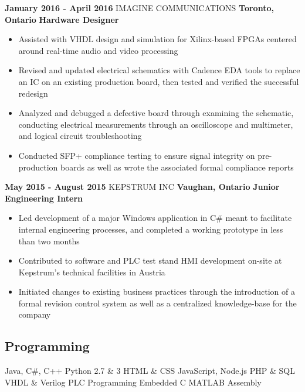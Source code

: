 \documentclass[hidelinks]{kkurucz-cv}
\begin{document}
\begin{minipage}{\textwidth}
\begin{entrylist}
\entry
{\textbf{January 2016 - April 2016}}
{IMAGINE COMMUNICATIONS}
{\textbf{Toronto, Ontario}}
{\textbf{Hardware Designer}}
{
\begin{itemize}
	\item Assisted with VHDL design and simulation for Xilinx-based FPGAs centered around real-time audio and video processing
	\item Revised and updated electrical schematics with Cadence EDA tools to replace an IC on an existing production board, then tested and verified the successful redesign
	\item Analyzed and debugged a defective board through examining the schematic, conducting electrical measurements through an oscilloscope and multimeter, and logical circuit troubleshooting
	\item Conducted SFP+ compliance testing to ensure signal integrity on pre-production boards as well as wrote the associated formal compliance reports
\end{itemize}
}

\entry
{\textbf{May 2015 - August 2015}}
{KEPSTRUM INC}
{\textbf{Vaughan, Ontario}}
{\textbf{Junior Engineering Intern}}
{
\begin{itemize}
	\item Led development of a major Windows application in C\# meant to facilitate internal engineering processes, and completed a working prototype in less than two months
	\item Contributed to software and PLC test stand HMI development on-site at Kepstrum’s technical facilities in Austria
	\item Initiated changes to existing business practices through the introduction of a formal revision control system as well as a centralized knowledge-base for the company
\end{itemize}
}

\end{entrylist}
\end{minipage}

\newpage

\begin{aside2}
\section{Programming}
Java, C\#, C++
Python 2.7 \& 3
HTML \& CSS
JavaScript, Node.js
PHP \& SQL
VHDL \& Verilog
PLC Programming
Embedded C
MATLAB
Assembly
\end{aside2}
\end{document}
